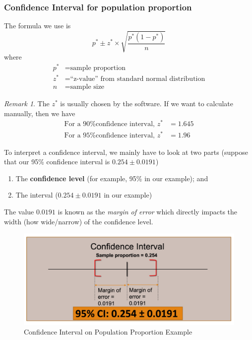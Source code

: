 \documentclass[math,code]{amznotes}
\theoremstyle{remark}
\newtheorem*{remark}{Remark}
\begin{document}
\subsubsection{Confidence Interval for population proportion}
The formula we use is
\begin{equation}
    p^*\pm z^*\times\sqrt{\frac{p^*(1-p^*)}{n}}
\end{equation}
where
\begin{align*}
    p^*&=\text{sample proportion} \\
    z^*&=\text{``z-value'' from standard normal distribution} \\
    n&=\text{sample size}
\end{align*}
\begin{notebox}
    \begin{remark}
        The $z^*$ is usually chosen by the software. If we want to calculate manually, then we have
        \begin{align*}
            \text{For a 90\% confidence interval, } z^*&=1.645 \\
            \text{For a 95\% confidence interval, } z^*&=1.96
        \end{align*}
    \end{remark}
\end{notebox}
To interpret a confidence interval, we mainly have to look at two parts (suppose that our 95\% confidence interval is $0.254\pm0.0191$)
\begin{enumerate}
    \item The \textbf{confidence level} (for example, 95\% in our example); and
    \item The interval ($0.254\pm0.0191$ in our example)
\end{enumerate}
The value $0.0191$ is known as the \textit{margin of error} which directly impacts the width (how wide/narrow) of the confidence level.
\begin{figure}[H]
    \centering
    \includegraphics[width=0.6\linewidth]{images/chapter4-confidence-interval-proportion-example.png}
    \caption{Confidence Interval on Population Proportion Example}
    \label{fig:confidence-interval-proportion-example}
\end{figure}
\end{document}
